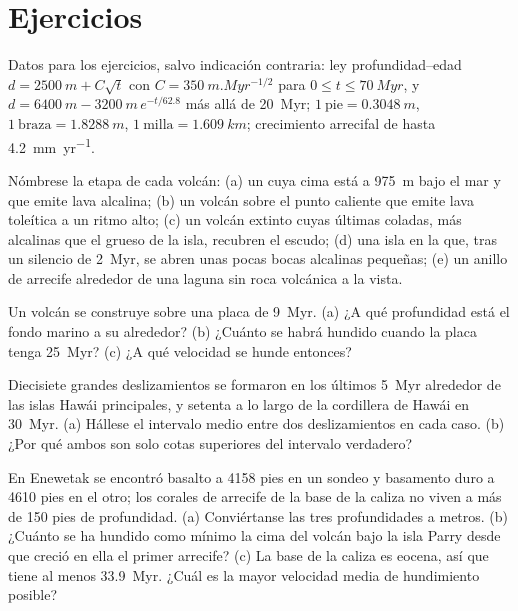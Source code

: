 \section*{Ejercicios}\label{sec:b2:oceanic-islands:exercises}

Datos para los ejercicios, salvo indicación contraria: ley profundidad--edad $d = \qty{2500}{m} + C\sqrt t$ con
$C = \qty{350}{m.Myr^{-1/2}}$ para $0 \le t \le \qty{70}{Myr}$, y $d = \qty{6400}{m} -
\qty{3200}{m}\,e^{-t/62.8}$ más allá de \qty{20}{Myr}; $1~\text{pie} = \qty{0.3048}{m}$, $1~\text{braza}
= \qty{1.8288}{m}$, $1~\text{milla} = \qty{1.609}{km}$; crecimiento arrecifal de hasta \qty{4.2}{mm.yr^{-1}}.

\begin{exercise}[$\star$]\label{exo:b2:oceanic-islands:1}
Nómbrese la etapa de cada volcán: (a) un  cuya cima está a \qty{975}{m} bajo el mar y que emite
lava alcalina; (b) un volcán sobre el punto caliente que emite lava toleítica a un ritmo alto; (c) un
volcán extinto cuyas últimas coladas, más alcalinas que el grueso de la isla, recubren el escudo; (d) una
isla en la que, tras un silencio de \qty{2}{Myr}, se abren unas pocas bocas alcalinas pequeñas; (e) un anillo de arrecife
alrededor de una laguna sin roca volcánica a la vista.
\end{exercise}

\begin{exercise}[$\star$]\label{exo:b2:oceanic-islands:2}
Un volcán se construye sobre una placa de \qty{9}{Myr}. (a) ¿A qué profundidad está el fondo marino a su alrededor? (b) ¿Cuánto
se habrá hundido cuando la placa tenga \qty{25}{Myr}? (c) ¿A qué velocidad se hunde entonces?
\end{exercise}

\begin{exercise}[$\star$]\label{exo:b2:oceanic-islands:3}
Diecisiete grandes deslizamientos se formaron en los últimos \qty{5}{Myr} alrededor de las islas Hawái principales, y
setenta a lo largo de la cordillera de Hawái en \qty{30}{Myr}. (a) Hállese el intervalo medio entre dos deslizamientos en
cada caso. (b) ¿Por qué ambos son solo cotas superiores del intervalo verdadero?
\end{exercise}

\begin{exercise}[$\star$]\label{exo:b2:oceanic-islands:4}
En Enewetak se encontró basalto a 4158 pies en un sondeo y basamento duro a 4610 pies en el
otro; los corales de arrecife de la base de la caliza no viven a más de 150 pies de profundidad. (a) Conviértanse
las tres profundidades a metros. (b) ¿Cuánto se ha hundido como mínimo la cima del volcán bajo la isla Parry
desde que creció en ella el primer arrecife? (c) La base de la caliza es eocena, así que tiene al menos
\qty{33.9}{Myr}. ¿Cuál es la mayor velocidad media de hundimiento posible?
\end{exercise}

